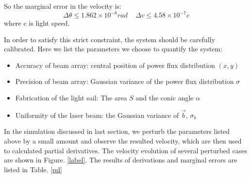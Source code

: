 \documentclass{article}
\begin{document}
	So the marginal error in the velocity is:
	\begin{equation}
		\Delta \theta \le 1.862 \times 10^{-8} rad
		\,\,\,\,\,\,\,
		\Delta v \le 4.58 \times 10^{-7} c
	\end{equation}
	where c is light speed.
	
	In order to satisfy this strict constraint, the system should be carefully calibrated. Here we list the parameters we choose to quantify the system:
	\begin{itemize}
		\item Accuracy of beam array: central position of power flux distribution $(x, y)$
		\item Precision of beam array: Gaussian variance of the power flux distribution $\sigma$
		\item Fabrication of the light sail: The area $S$ and the conic angle $\alpha$
		\item Uniformity of the laser beam: the Gaussian variance of $\vec{b}$, $\sigma_b$
	\end{itemize}
	
	In the simulation discussed in last section, we perturb the parameters listed above by a small amount and observe the resulted velocity, which are then used to calculated partial derivatives. The velocity evolution of several perturbed cases are shown in Figure. \ref{label}. The results of derivations and marginal errors are listed in Table. \ref{pd}
	
\end{document}

